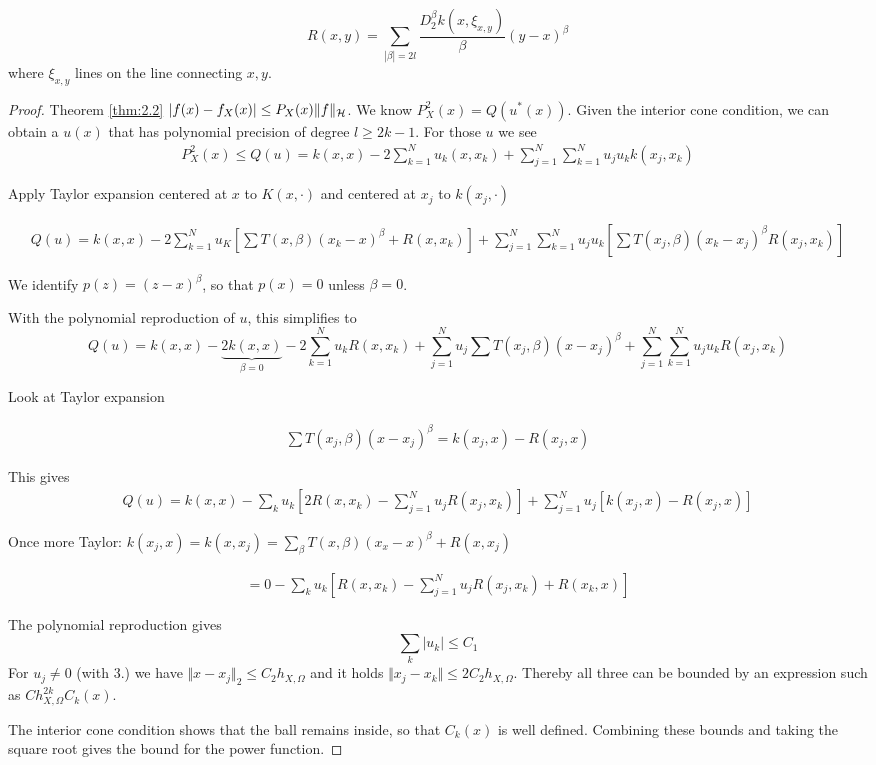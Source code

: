 \[R(x,y)=\sum_{|\beta|=2l}\frac{D_2^\beta k(x,\xi_{x,y})}{\beta}(y-x)^\beta\]
where $\xi_{x,y}$ lines on the line connecting $x,y$.

\begin{proof}
    Theorem \ref{thm:2.2} $|f(x)-f_X(x)|\leq P_X(x)\Vert f\Vert_{\mathcal{H}}$. 
    We know $P_X^2(x)=Q(u^*(x))$. Given the interior cone condition, we 
    can obtain a $u(x)$ that has polynomial precision of degree $l\geq 2k-1$. 
    For those $u$ we see 
    \begin{align*}
        P_X^2(x)\leq Q(u)=k(x,x)-2\sum_{k=1}^{N}u_k(x,x_k)+\sum_{j=1}^{N}\sum_{k=1}^{N} u_ju_k k(x_j,x_k)
\end{align*}

Apply Taylor expansion centered at $x$ to $K(x,\cdot)$ and centered at $x_j$ to $k(x_j,\cdot)$

\begin{align*}
    Q(u)=k(x,x)-2\sum_{k=1}^{N}u_K\left[\sum T(x,\beta)(x_k-x)^\beta+R(x,x_k) \right]+\sum_{j=1}^{N}\sum_{k=1}^N u_j u_k \left[\sum T(x_j,\beta)(x_k-x_j)^\beta R(x_j,x_k) \right]
\end{align*}

We identify $p(z)=(z-x)^\beta$, so that $p(x)=0$ unless $\beta=0$.

With the polynomial reproduction of $u$, this simplifies to 
\[Q(u)=k(x,x)-\underbrace{2k(x,x)}_{\beta=0}-2\sum_{k=1}^N u_k R(x,x_k)+\sum_{j=1}^{N} u_j\sum T(x_j,\beta)(x-x_j)^\beta+\sum_{j=1}^N\sum_{k=1}^N u_ju_k R(x_j,x_k)\] 

Look at Taylor expansion 

\begin{align*}
    \sum T(x_j,\beta)(x-x_j)^\beta = k(x_j,x)-R(x_j,x)
\end{align*}

This gives 
\begin{align*}
    Q(u)=k(x,x)-\sum_{k}u_k\left[2R(x,x_k)-\sum_{j=1}^N u_j R(x_j,x_k) \right]+\sum_{j=1}^N u_j \left[k(x_j,x)-R(x_j,x)\right]
\end{align*}

Once more Taylor: $k(x_j,x)=k(x,x_j)=\sum_\beta T(x,\beta)(x_x-x)^\beta+R(x,x_j)$

\begin{align*}
    =0-\sum_k u_k \left[R(x,x_k)-\sum_{j=1}^N u_j R(x_j,x_k)+R(x_k,x) \right]
\end{align*}

The polynomial reproduction gives 
\[\sum_{k}|u_k|\leq C_1\]
For $u_j\neq 0$ (with 3.) we have $\Vert x-x_j\Vert_2 \leq C_2 h_{X,\Omega}$
and it holds $\Vert x_j-x_k\Vert \leq 2C_2h_{X,\Omega}$. Thereby all three can be bounded by
an expression such as $Ch_{X,\Omega}^{2k}C_k(x)$.

The interior cone condition shows that the ball remains inside, so that 
$C_k(x)$ is well defined. Combining these bounds and taking the square root gives 
the bound for the power function.
\end{proof}







